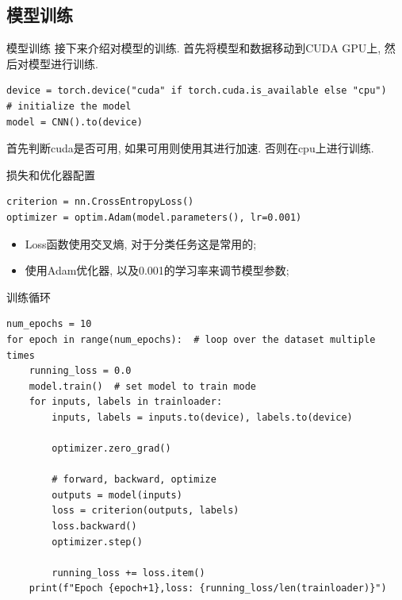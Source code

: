 \documentclass{beamer}
\begin{document}
\subsection{模型训练}
\begin{frame}[fragile]{模型训练}
	接下来介绍对模型的训练. 首先将模型和数据移动到CUDA GPU上, 然后对模型进行训练.
	\begin{verbatim}
device = torch.device("cuda" if torch.cuda.is_available else "cpu")
# initialize the model
model = CNN().to(device)
	\end{verbatim}
	首先判断cuda是否可用, 如果可用则使用其进行加速. 否则在cpu上进行训练.
\end{frame}

\begin{frame}[fragile]{损失和优化器配置}
	\begin{verbatim}
criterion = nn.CrossEntropyLoss()
optimizer = optim.Adam(model.parameters(), lr=0.001)
	\end{verbatim}
	\begin{itemize}
		\item Loss函数使用交叉熵, 对于分类任务这是常用的;
		\item 使用Adam优化器, 以及0.001的学习率来调节模型参数;
	\end{itemize}
\end{frame}
\begin{frame}[fragile]{训练循环}
	\begin{verbatim}
num_epochs = 10
for epoch in range(num_epochs):  # loop over the dataset multiple times
    running_loss = 0.0
    model.train()  # set model to train mode
    for inputs, labels in trainloader:
        inputs, labels = inputs.to(device), labels.to(device)

        optimizer.zero_grad()

        # forward, backward, optimize
        outputs = model(inputs)
        loss = criterion(outputs, labels)
        loss.backward()
        optimizer.step()

        running_loss += loss.item()
    print(f"Epoch {epoch+1},loss: {running_loss/len(trainloader)}")
	\end{verbatim}
\end{frame}
\end{document}
